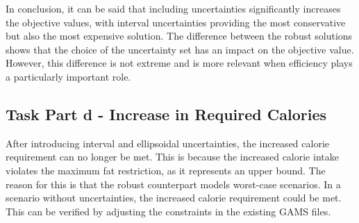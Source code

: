 \documentclass[a4paper,12pt]{article}
\begin{document}
In conclusion, it can be said that including uncertainties significantly increases the objective values, with interval uncertainties providing the most conservative but also the most expensive solution. The difference between the robust solutions shows that the choice of the uncertainty set has an impact on the objective value. However, this difference is not extreme and is more relevant when efficiency plays a particularly important role.

\subsection*{Task Part d - Increase in Required Calories}

After introducing interval and ellipsoidal uncertainties, the increased calorie requirement can no longer be met. This is because the increased calorie intake violates the maximum fat restriction, as it represents an upper bound. The reason for this is that the robust counterpart models worst-case scenarios. In a scenario without uncertainties, the increased calorie requirement could be met.
This can be verified by adjusting the constraints in the existing GAMS files.

\newpage
\end{document}
